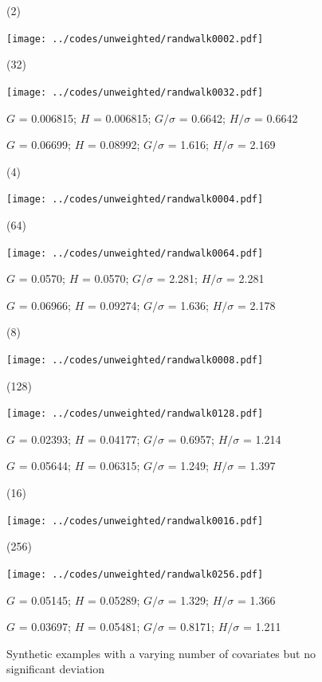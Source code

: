 \documentclass{article}
\newlength{\vertsep}
\newlength{\imsize}
\newlength{\imsized}
\begin{document}
\begin{figure}
\begin{centering}

(2) \parbox{\imsize}{\texttt{[image: ../codes/unweighted/randwalk0002.pdf]}}
\quad\quad
(32) \parbox{\imsize}{\texttt{[image: ../codes/unweighted/randwalk0032.pdf]}}

\parbox{\imsized}{\hfil \footnotesize $G$ = 0.006815; $H$ = 0.006815;
$G/\sigma$ = 0.6642; $H/\sigma$ = 0.6642}
\parbox{\imsized}{\hfil \footnotesize $G$ = 0.06699; $H$ = 0.08992;
$G/\sigma$ = 1.616; $H/\sigma$ = 2.169}

\vspace{\vertsep}

(4) \parbox{\imsize}{\texttt{[image: ../codes/unweighted/randwalk0004.pdf]}}
\quad\quad
(64) \parbox{\imsize}{\texttt{[image: ../codes/unweighted/randwalk0064.pdf]}}

\parbox{\imsized}{\hfil \footnotesize $G$ = 0.0570; $H$ = 0.0570;
$G/\sigma$ = 2.281; $H/\sigma$ = 2.281}
\parbox{\imsized}{\hfil \footnotesize $G$ = 0.06966; $H$ = 0.09274;
$G/\sigma$ = 1.636; $H/\sigma$ = 2.178}

\vspace{\vertsep}

(8) \parbox{\imsize}{\texttt{[image: ../codes/unweighted/randwalk0008.pdf]}}
\quad\quad
(128) \parbox{\imsize}{\texttt{[image: ../codes/unweighted/randwalk0128.pdf]}}

\parbox{\imsized}{\hfil \footnotesize $G$ = 0.02393; $H$ = 0.04177;
$G/\sigma$ = 0.6957; $H/\sigma$ = 1.214}
\parbox{\imsized}{\hfil \footnotesize $G$ = 0.05644; $H$ = 0.06315;
$G/\sigma$ = 1.249; $H/\sigma$ = 1.397}

\vspace{\vertsep}

(16) \parbox{\imsize}{\texttt{[image: ../codes/unweighted/randwalk0016.pdf]}}
\quad\quad
(256) \parbox{\imsize}{\texttt{[image: ../codes/unweighted/randwalk0256.pdf]}}

\parbox{\imsized}{\hfil \footnotesize $G$ = 0.05145; $H$ = 0.05289;
$G/\sigma$ = 1.329; $H/\sigma$ = 1.366}
\parbox{\imsized}{\hfil \footnotesize $G$ = 0.03697; $H$ = 0.05481;
$G/\sigma$ = 0.8171; $H/\sigma$ = 1.211}

\end{centering}
\caption{Synthetic examples with a varying number of covariates
but no significant deviation}
\label{randwalk}
\end{figure}


\clearpage
\end{document}
